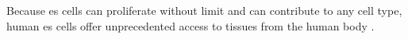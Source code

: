 Because \gls{es} cells can proliferate without limit and can contribute to any cell type, human \gls{es} cells offer unprecedented access to tissues from the human body \cite{department2006regenerative}. 



